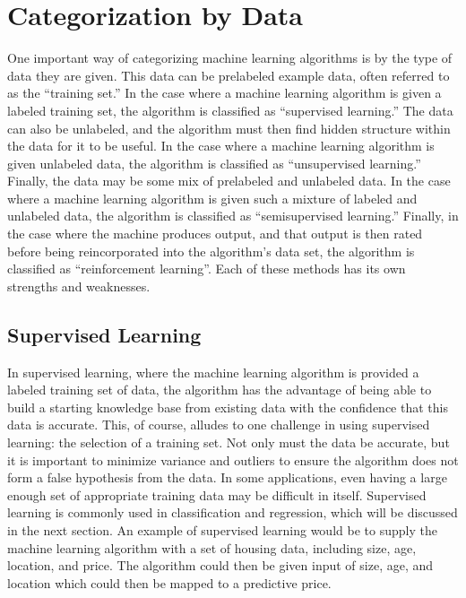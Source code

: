 
\section{Categorization by Data} %

One important way of categorizing machine learning algorithms is by the type of data they are given. This data can be prelabeled example data, often referred to as the ``training set.'' In the case where a machine learning algorithm is given a labeled training set, the algorithm is classified as ``supervised learning.'' The data can also be unlabeled, and the algorithm must then find hidden structure within the data for it to be useful. In the case where a machine learning algorithm is given unlabeled data, the algorithm is classified as ``unsupervised learning.'' Finally, the data may be some mix of prelabeled and unlabeled data. In the case where a machine learning algorithm is given such a mixture of labeled and unlabeled data, the algorithm is classified as ``semisupervised learning.'' Finally, in the case where the machine produces output, and that output is then rated before being reincorporated into the algorithm's data set, the algorithm is classified as ``reinforcement learning''. Each of these methods has its own strengths and weaknesses.


\subsection{Supervised Learning} %

In supervised learning, where the machine learning algorithm is provided a labeled training set of data, the algorithm has the advantage of being able to build a starting knowledge base from existing data with the confidence that this data is accurate. This, of course, alludes to one challenge in using supervised learning: the selection of a training set. Not only must the data be accurate, but it is important to minimize variance and outliers to ensure the algorithm does not form a false hypothesis from the data. In some applications, even having a large enough set of appropriate training data may be difficult in itself. Supervised learning is commonly used in classification and regression, which will be discussed in the next section. An example of supervised learning would be to supply the machine learning algorithm with a set of housing data, including size, age, location, and price. The algorithm could then be given input of size, age, and location which could then be mapped to a predictive price. \cite{website:ng}

